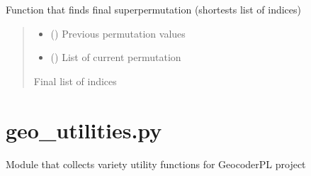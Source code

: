 \documentclass[letterpaper,10pt,english]{sphinxmanual}
\begin{document}
\begin{fulllineitems}
\begin{fulllineitems}
\label{\detokenize{super_permutations:super_permutations.SuperPerms.get_super_perm}}
\pysigstartsignatures
{}
\pysigstopsignatures
\sphinxAtStartPar
Function that finds final superpermutation (shortests list of indices)
\begin{quote}\begin{description}
\begin{itemize}
\item {} 
\sphinxAtStartPar
{} (\sphinxcode{\sphinxupquote{Optional}}{[}\sphinxcode{\sphinxupquote{str}}{]}) \textendash{} Previous permutation values

\item {} 
\sphinxAtStartPar
{} (\sphinxcode{\sphinxupquote{Optional}}{[}\sphinxcode{\sphinxupquote{List}}{[}\sphinxcode{\sphinxupquote{str}}{]}{]}) \textendash{} List of current permutation

\end{itemize}

\sphinxAtStartPar
\sphinxcode{\sphinxupquote{List}}{[}\sphinxcode{\sphinxupquote{int}}{]}

\sphinxAtStartPar
Final list of indices

\end{description}\end{quote}

\end{fulllineitems}


\end{fulllineitems}


\sphinxstepscope


\chapter{geo\_utilities.py}
\label{\detokenize{geo_utilities:module-geo_utilities}}\label{\detokenize{geo_utilities:geo-utilities-py}}\label{\detokenize{geo_utilities::doc}}
\sphinxAtStartPar
Module that collects variety utility functions for GeocoderPL project
\end{document}
